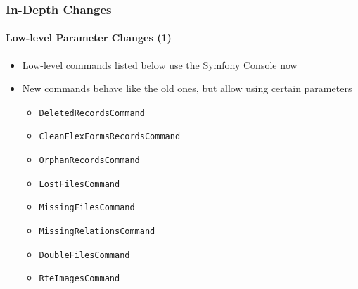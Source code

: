 \begin{frame}[fragile]
	\frametitle{In-Depth Changes}
	\framesubtitle{Low-level Parameter Changes (1)}


	\begin{itemize}
		\item Low-level commands listed below use the Symfony Console now
		\item New commands behave like the old ones, but allow using certain parameters

			\begin{itemize}
				\item \texttt{DeletedRecordsCommand}
				\item \texttt{CleanFlexFormsRecordsCommand}
				\item \texttt{OrphanRecordsCommand}
				\item \texttt{LostFilesCommand}
				\item \texttt{MissingFilesCommand}
				\item \texttt{MissingRelationsCommand}
				\item \texttt{DoubleFilesCommand}
				\item \texttt{RteImagesCommand}
			\end{itemize}

	\end{itemize}

\end{frame}



